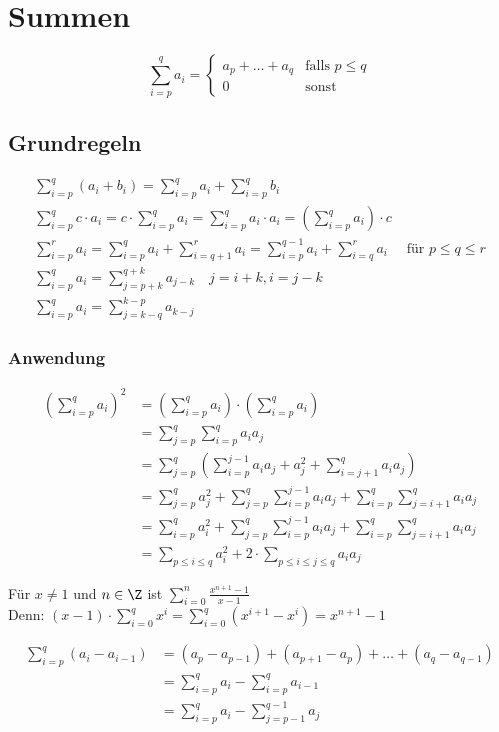 \section{Summen}
\[ \sum_{i=p}^q a_i = \begin{cases}
	a_p + \dots + a_q	&\text{falls } p \leq q	\\
	0				&\text{sonst}		
\end{cases} \]

\subsection{Grundregeln}
\begin{gather*}
	\sum_{i=p}^q (a_i + b_i) = \sum_{i=p}^q a_i + \sum_{i=p}^q b_i \\
	\sum_{i=p}^q c \cdot a_i = c \cdot \sum_{i=p}^q a_i = \sum_{i=p}^q a_i \cdot a_i = \left( \sum_{i=p}^q a_i \right) \cdot c \\
	\sum_{i=p}^r a_i = \sum_{i=p}^q a_i + \sum_{i=q+1}^r a_i = \sum_{i=p}^{q-1} a_i + \sum_{i=q}^r a_i \quad \text{ für } p \leq q \leq r \\
	\sum_{i=p}^q a_i = \sum_{j=p+k}^{q+k} a_{j-k} \quad j = i+k , i = j-k \\
	\sum_{i=p}^q a_i = \sum_{j=k-q}^{k-p} a_{k-j}
\end{gather*}

\subsubsection{Anwendung}
\[ \begin{split}
	\left( \sum_{i=p}^q a_i \right)^2	&= \left( \sum_{i=p}^q a_i \right) \cdot \left( \sum_{i=p}^q a_i \right) \\
							&= \sum_{j=p}^q \sum_{i=p}^q a_i a_j \\
							&= \sum_{j=p}^q \left( \sum_{i=p}^{j-1} a_i a_j + a_j^2 + \sum_{i=j+1}^q a_i a_j \right) \\
							&= \sum_{j=p}^q a_j^2 + \sum_{j=p}^q \sum_{i=p}^{j-1} a_i a_j + \sum_{i=p}^q \sum_{j=i+1}^q a_i a_j \\
							&= \sum_{i=p}^q a_i^2 + \sum_{j=p}^q \sum_{i=p}^{j-1} a_i a_j + \sum_{i=p}^q \sum_{j=i+1}^q a_i a_j \\
							&= \sum_{p \leq i \leq q} a_i^2 + 2 \cdot \sum_{p \leq i \leq j \leq q} a_i a_j
\end{split} \]
\begin{bsp*}[note = Geometrische Summe]
	Für $x \neq 1$ und $n \in \Z$ ist $\sum_{i=0}^n \frac{x^{n+1} - 1}{x-1}$\\
	Denn: $(x-1) \cdot \sum_{i=0}^q x^i = \sum _{i=0}^q (x^{i+1} - x^i) = x^{n+1} - 1$	
\end{bsp*}
\begin{bsp*}[note = Teleskopsumme]
	\[ \begin{split}
		\sum_{i=p}^q (a_i - a_{i-1})	&= (a_p - a_{p-1}) + (a_{p+1} - a_p) + \dots + (a_q - a_{q-1}) \\
							&= \sum_{i=p}^q a_i - \sum_{i=p}^q a_{i-1} \\
							&= \sum_{i=p}^q a_i - \sum_{j=p-1}^{q-1} a_j
	\end{split} \]
\end{bsp*}

